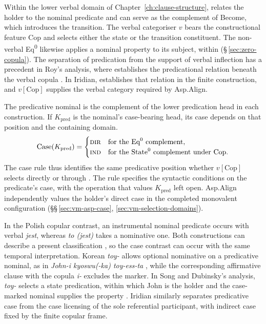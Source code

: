 Within the lower verbal domain of Chapter~\ref{ch:clause-structure},
 relates the holder to the nominal predicate and can
serve as the complement of Become, which introduces the transition.
The verbal categoriser $v$ bears the constructional feature Cop and
selects either the state or the transition constituent. The non-verbal
Eq\textsuperscript{0} likewise applies a nominal property to its subject,
within  (§\,\ref{sec:zero-copula}). The separation of
predication from the support of verbal inflection has a precedent in
Roy's analysis, where  establishes the predicational relation
beneath the verbal copula \cite[§2.2]{roy2013}. In Iridian,
 establishes that relation in the finite construction,
and $v[\mathrm{Cop}]$ supplies the verbal category required by Asp.Align.

The predicative nominal is the complement of the lower predication
head in each construction. If $K_{\mathrm{pred}}$ is the nominal's
case-bearing head, its case depends on that position and the
containing domain.
\[
\operatorname{Case}(K_{\mathrm{pred}})=
\begin{cases}
 \textsc{dir} & \text{for the Eq}^{0}\text{ complement},\\
 \textsc{ind} & \text{for the State}^{0}\text{ complement under Cop}.
\end{cases}
\]
The case rule thus identifies the same predicative position whether
$v[\mathrm{Cop}]$ selects  directly or through
. The rule specifies the syntactic conditions on the
predicate's case, with the operation that values $K_{\mathrm{pred}}$
left open. Asp.Align independently values the holder's direct case
in the completed monovalent configuration
(§§\,\ref{sec:vm-asp-case}, \ref{sec:vm-selection-domains}).

In the Polish copular contrast, an instrumental nominal predicate
occurs with verbal \textit{jest}, whereas \textit{to (jest)} takes
a nominative one. Both constructions can describe a present
classification \cite[§2.2.1]{djarv2021}, so the case contrast can occur
with the same temporal interpretation. Korean \textit{toy-} 
allows optional nominative on a predicative nominal, as in
\textit{John-i kyoswu(-ka) toy-ess-ta} ,
while the corresponding affirmative clause with the copula \textit{i-}
excludes the marker. In Song and Dubinsky's analysis, \textit{toy-} selects
a state predication, within which John is the holder and the
case-marked nominal supplies the property
\cite[425, 427--430]{songdubinsky2018}. Iridian similarly separates
predicative case from the case licensing of the sole referential
participant, with indirect case fixed by the finite copular frame.

